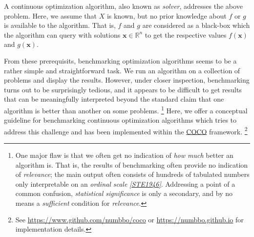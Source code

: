 \documentclass[letterpaper,12pt,english]{article}
\newcommand{\ve}[1]{{\boldsymbol{#1}}}
\newcommand{\x}{\ensuremath{\ve{x}}}
\begin{document}
A continuous optimization algorithm, also known as \emph{solver}, addresses the
above problem.
Here, we assume that \(X\) is known, but no prior knowledge about \(f\) or
\(g\) is available to the algorithm.
That is, \(f\) and \(g\) are considered as a black-box which the algorithm can
query with solutions \(\x\in\mathbb{R}^n\) to get the respective values
\(f(\x)\) and \(g(\x)\).

From these prerequisits, benchmarking optimization algorithms seems to be a
rather simple and straightforward task. We run an algorithm on a collection of
problems and display the results. However, under closer inspection,
benchmarking turns out to be surprisingly tedious, and it appears to be
difficult to get results that can be meaningfully interpreted beyond the
standard claim that one algorithm is better than another on some problems. \footnote[1]{
One major flaw is that we often get no
indication of \emph{how much} better an algorithm is.
That is, the results of benchmarking often provide no indication of
\emph{relevance};
the main output often consists of hundreds of tabulated numbers
only interpretable on an \emph{ordinal scale} \label{index:id7}{\hyperref[index:ste1946]{\emph{{[}STE1946{]}}}}. Addressing a point of a
common confusion, \emph{statistical significance} is only a secondary, and by no
means a \emph{sufficient} condition for \emph{relevance}.
}
Here, we offer a conceptual guideline for benchmarking
continuous optimization algorithms which tries to address this challenge and
has been implemented within the \href{https://github.com/numbbo/coco}{COCO} framework. \footnote[2]{
See \href{https://www.github.com/numbbo/coco}{https://www.github.com/numbbo/coco} or \href{https://numbbo.github.io}{https://numbbo.github.io} for implementation details.
}
\end{document}
